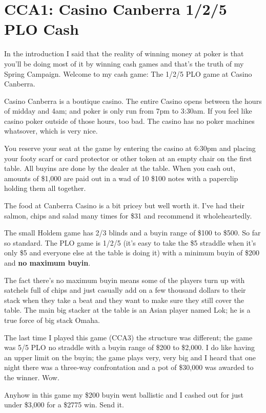 \section*{CCA1: Casino Canberra 1/2/5 PLO Cash}

In the introduction I said that the reality of winning money at poker
is that you'll be doing most of it by winning cash games and that's
the truth of my Spring Campaign. Welcome to my cash game: The 1/2/5
PLO game at Casino Canberra.

Casino Canberra is a boutique casino. The entire Casino opens between
the hours of midday and 4am; and poker is only run from 7pm to
3:30am. If you feel like casino poker outside of those hours, too bad.
The casino has no poker machines whatsover, which is very nice.

You reserve your seat at the game by entering the casino at 6:30pm and
placing your footy scarf or card protector or other token at an empty
chair on the first table. All buyins are done by the dealer at the
table. When you cash out, amounts of \$1,000 are paid out in a wad of
10 \$100 notes with a paperclip holding them all together.

The food at Canberra Casino is a bit pricey but well worth it. I've
had their salmon, chips and salad many times for \$31 and recommend it
wholeheartedly.

The small Holdem game has 2/3 blinds and a buyin range of \$100 to
\$500. So far so standard. The PLO game is 1/2/5 (it's easy to take
the \$5 straddle when it's only \$5 and everyone else at the table is
doing it) with a minimum buyin of \$200 and \textbf{no maximum buyin}.

The fact there's no maximum buyin means some of the players turn up
with satchels full of chips and just casually add on a few thousand
dollars to their stack when they take a beat and they want to make
sure they still cover the table. The main big stacker at the table is
an Asian player named Lok; he is a true force of big stack Omaha.

The last time I played this game (CCA3) the structure was different;
the game was 5/5 PLO no straddle with a buyin range of \$200 to
\$2,000. I do like having an upper limit on the buyin; the game plays
very, very big and I heard that one night there was a three-way
confrontation and a pot of \$30,000 was awarded to the winner. Wow.

Anyhow in this game my \$200 buyin went ballistic and I cashed out for
just under \$3,000 for a \$2775 win. Send it.

